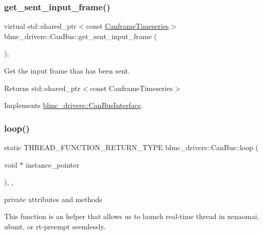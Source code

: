 \subsubsection{\texorpdfstring{get\+\_\+sent\+\_\+input\+\_\+frame()}{get\_sent\_input\_frame()}}
{\footnotesize\ttfamily virtual std\+::shared\+\_\+ptr$<$const \hyperlink{classblmc__drivers_1_1CanBusInterface_a2da2627c961927f48359ae7d7e1aa4da}{Canframe\+Timeseries}$>$ blmc\+\_\+drivers\+::\+Can\+Bus\+::get\+\_\+sent\+\_\+input\+\_\+frame (\begin{DoxyParamCaption}{ }\end{DoxyParamCaption})\hspace{0.3cm}{\ttfamily [inline]}, {\ttfamily [virtual]}}



Get the input frame thas has been sent. 

\begin{DoxyReturn}{Returns}
std\+::shared\+\_\+ptr$<$const Canframe\+Timeseries$>$ 
\end{DoxyReturn}


Implements \hyperlink{classblmc__drivers_1_1CanBusInterface_aca7e703983284a09c497c8182c0684d5}{blmc\+\_\+drivers\+::\+Can\+Bus\+Interface}.

\mbox{\label{classblmc__drivers_1_1CanBus_ab39625e5a1fea7d25d0967b4a48de0b4}} 
\subsubsection{\texorpdfstring{loop()}{loop()}}
{\footnotesize\ttfamily static T\+H\+R\+E\+A\+D\+\_\+\+F\+U\+N\+C\+T\+I\+O\+N\+\_\+\+R\+E\+T\+U\+R\+N\+\_\+\+T\+Y\+PE blmc\+\_\+drivers\+::\+Can\+Bus\+::loop (\begin{DoxyParamCaption}\item[{void $\ast$}]{instance\+\_\+pointer }\end{DoxyParamCaption})\hspace{0.3cm}{\ttfamily [inline]}, {\ttfamily [static]}, {\ttfamily [private]}}



private attributes and methods 

This function is an helper that allows us to launch real-\/time thread in xenaomai, ubunt, or rt-\/preempt seemlessly.


